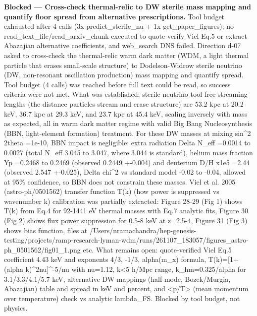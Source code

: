 \documentclass[11pt,a4paper]{article}
\begin{document}
\textbf{Blocked --- Cross-check thermal-relic to DW sterile mass mapping and quantify floor spread from alternative prescriptions.} Tool budget exhausted after 4 calls (3x predict\_sterile\_nu + 1x get\_paper\_figures); no read\_text\_file/read\_arxiv\_chunk executed to quote-verify Viel Eq.5 or extract Abazajian alternative coefficients, and web\_search DNS failed. Direction d-07 asked to cross-check the thermal-relic warm dark matter (WDM, a light thermal particle that erases small-scale structure) to Dodelson-Widrow sterile neutrino (DW, non-resonant oscillation production) mass mapping and quantify spread. Tool budget (4 calls) was reached before full text could be read, so success criteria were not met. What was established: sterile-neutrino tool free-streaming lengths (the distance particles stream and erase structure) are 53.2 kpc at 20.2 keV, 36.7 kpc at 29.3 keV, and 23.7 kpc at 45.4 keV, scaling inversely with mass as expected, all in warm dark matter regime with valid Big Bang Nucleosynthesis (BBN, light-element formation) treatment. For these DW masses at mixing sin\textasciicircum{}2 2theta =1e-10, BBN impact is negligible: extra radiation Delta N\_eff =0.0014 to 0.0027 (total N\_eff 3.045 to 3.047, where 3.044 is standard), helium mass fraction Yp =0.2468 to 0.2469 (observed 0.2449 +-0.004) and deuterium D/H x1e5 =2.44 (observed 2.547 +-0.025), Delta chi\textasciicircum{}2 vs standard model -0.02 to -0.04, allowed at 95\% confidence, so BBN does not constrain these masses. Viel et al. 2005 (astro-ph/0501562) transfer function T(k) (how power is suppressed vs wavenumber k) calibration was partially extracted: Figure 28-29 (Fig 1) shows T(k) from Eq.4 for 92-1441 eV thermal masses with Eq.7 analytic fits, Figure 30 (Fig 2) shows flux power suppression for 0.5-8 keV at z=2.5-4, Figure 31 (Fig 3) shows bias function, files at /Users/nramachandra/hep-genesis-testing/projects/ramp-research-lyman-wdm/runs/261107\_183057/figures\_astro-ph\_0501562/fig01\_1.png etc. What remains open: quote-verified Viel Eq.5 coefficient 4.43 keV and exponents 4/3, -1/3, alpha(m\_x) formula, T(k)=[1+(alpha k)\textasciicircum{}2nu]\textasciicircum{}-5/nu with nu=1.12, k\textless{}5 h/Mpc range, k\_hm=0.325/alpha for 3.1/3.3/4.1/5.7 keV, alternative DW mappings (half-mode, Bozek/Murgia, Abazajian) table and spread in keV and percent, and \textless{}p/T\textgreater{} (mean momentum over temperature) check vs analytic lambda\_FS. Blocked by tool budget, not physics.
\end{document}
